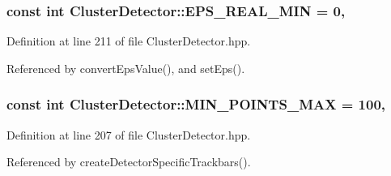 \hypertarget{classmultiscale_1_1analysis_1_1ClusterDetector_ad9542bde7e3bf36d501a0b203dc61e09}{
\subsubsection[{E\-P\-S\-\_\-\-R\-E\-A\-L\-\_\-\-M\-I\-N}]{\setlength{\rightskip}{0pt plus 5cm}const int Cluster\-Detector\-::\-E\-P\-S\-\_\-\-R\-E\-A\-L\-\_\-\-M\-I\-N = 0\hspace{0.3cm}{\ttfamily [static]}, {\ttfamily [private]}}}\label{classmultiscale_1_1analysis_1_1ClusterDetector_ad9542bde7e3bf36d501a0b203dc61e09}


Definition at line 211 of file Cluster\-Detector.\-hpp.



Referenced by convert\-Eps\-Value(), and set\-Eps().

\hypertarget{classmultiscale_1_1analysis_1_1ClusterDetector_aabb41b5c6e865ee33cbb27568cae5a2d}{
\subsubsection[{M\-I\-N\-\_\-\-P\-O\-I\-N\-T\-S\-\_\-\-M\-A\-X}]{\setlength{\rightskip}{0pt plus 5cm}const int Cluster\-Detector\-::\-M\-I\-N\-\_\-\-P\-O\-I\-N\-T\-S\-\_\-\-M\-A\-X = 100\hspace{0.3cm}{\ttfamily [static]}, {\ttfamily [private]}}}\label{classmultiscale_1_1analysis_1_1ClusterDetector_aabb41b5c6e865ee33cbb27568cae5a2d}


Definition at line 207 of file Cluster\-Detector.\-hpp.



Referenced by create\-Detector\-Specific\-Trackbars().

